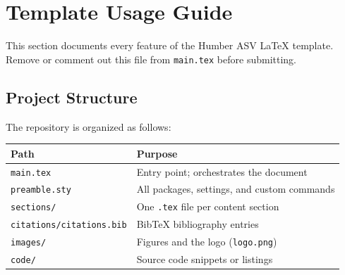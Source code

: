 %
%
%
%

\section{Template Usage Guide}

This section documents every feature of the Humber ASV \LaTeX{} template.
Remove or comment out this file from \texttt{main.tex} before submitting.

\subsection{Project Structure}

The repository is organized as follows:

\begin{longtable}{ll}
    \textbf{Path} & \textbf{Purpose} \\
    \hline
    \texttt{main.tex} & Entry point; orchestrates the document \\
    \texttt{preamble.sty} & All packages, settings, and custom commands \\
    \texttt{sections/} & One \texttt{.tex} file per content section \\
    \texttt{citations/citations.bib} & BibTeX bibliography entries \\
    \texttt{images/} & Figures and the logo (\texttt{logo.png}) \\
    \texttt{code/} & Source code snippets or listings \\
\end{longtable}

